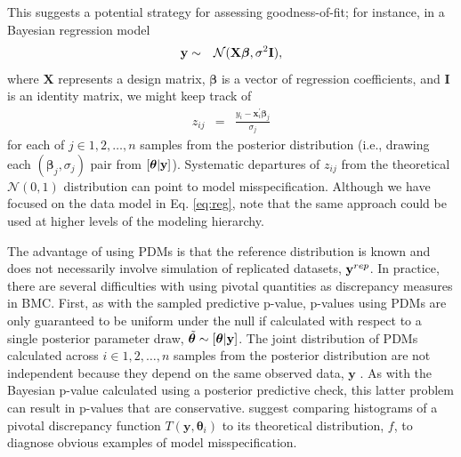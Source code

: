 \documentclass[12pt,english]{article}
\begin{document}
\begin{spacing}{1.9}
This suggests a potential strategy for assessing goodness-of-fit; for
instance, in a Bayesian regression model
\begin{eqnarray}
  \label{eq:reg}
  {\bf y} & \sim & \mathcal{N}(\textbf{X} \boldsymbol{\beta},\sigma^2 \textbf{I}),
\end{eqnarray}
where $\textbf{X}$ represents a design matrix, $\boldsymbol{\beta}$ is
a vector of regression coefficients, and $\textbf{I}$ is an identity
matrix, we might keep track of
\begin{eqnarray}
  \label{eq:resid}
  z_{ij} & = & \frac{y_i - \textbf{x}_i^\prime \boldsymbol{\beta}_j}{\sigma_j}
\end{eqnarray}
for each of $j \in {1, 2, \hdots, n}$ samples from the posterior
distribution (i.e., drawing each $(\boldsymbol{\beta}_j, \sigma_j)$
pair from $[\boldsymbol{\theta}|{\bf y}]$).  Systematic departures of
$z_{ij}$ from the theoretical $\mathcal{N}(0,1)$ distribution can
point to model misspecification.  Although we have focused on the data
model in Eq. \ref{eq:reg}, note that the same approach could be used
at higher levels of the modeling hierarchy.

The advantage of using PDMs is that the reference distribution is
known and does not necessarily involve simulation of replicated
datasets, ${\bf y}^{rep}$.  In practice, there are several difficulties
with using pivotal quantities as discrepancy measures in BMC.  First,
as with the sampled predictive p-value, p-values using PDMs are only
guaranteed to be uniform under the null if calculated with respect to
a single posterior parameter draw,
$\tilde{\boldsymbol{\theta}} \sim [\boldsymbol{\theta} | {\bf y}]$.  The joint distribution of
PDMs calculated across $i \in 1,2,\hdots,n$ samples from the posterior
distribution are not independent because they depend on the same
observed data, $\textbf{y}$ \citep{Johnson2004}.  As with the Bayesian
p-value calculated using a posterior predictive check, this latter
problem can result in p-values that are conservative.
\citet{YuanJohnson2012} suggest comparing histograms of a pivotal
discrepancy function $T(\textbf{y},\boldsymbol{\theta}_i)$ to its
theoretical distribution, $f$, to diagnose obvious examples of model
misspecification.


\end{spacing}
\end{document}
